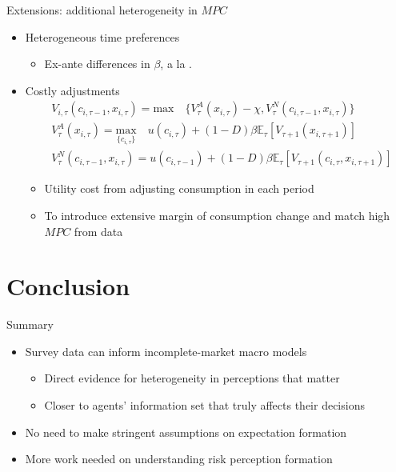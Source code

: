 \documentclass{beamer}
\begin{document}
\begin{frame}{Extensions: additional heterogeneity in $MPC$}

\begin{itemize}
	\item Heterogeneous time preferences
\begin{itemize}
	\item Ex-ante differences in $\beta$, a la \cite{krusell1998income,carroll2017distribution,krueger2016macroeconomics}.
\end{itemize}
	\item Costly adjustments
	\begin{equation*}
		\begin{split}
			& V_{i,\tau}(c_{i,\tau-1},x_{i,\tau}) = \textrm{max} \quad \{V^A_{\tau}(x_{i,\tau})-\chi,V^N_{\tau}(c_{i,\tau-1},x_{i,\tau})\} \\
			& V^A_{\tau}(x_{i,\tau}) = \underset{\{c_{i,\tau}\}}{\textrm{max}} \quad u(c_{i,\tau}) + (1-D)\beta \mathbb{E}_{\tau}\left[V_{\tau+1}(x_{i,\tau+1})\right]  \\
			& V^N_{\tau}(c_{i,\tau-1},x_{i,\tau}) =  u(c_{i,\tau-1}) + (1-D)\beta \mathbb{E}_{\tau}\left[V_{\tau+1}(c_{i,\tau},x_{i,\tau+1})\right]
		\end{split}
	\end{equation*}
	\begin{itemize}
		\item Utility cost from adjusting consumption in each period
		\item To introduce extensive margin of consumption change and match high $MPC$ from data 
	\end{itemize}
\end{itemize}
 \end{frame}




\section{Conclusion}


\begin{frame}{Summary}
	
	\begin{itemize}
 	\item Survey data can inform incomplete-market macro models 
 	\begin{itemize}
 		\item Direct evidence for heterogeneity in perceptions that matter
 		\item Closer to agents' information set that truly affects their decisions
 	\end{itemize}
	\item No need to make stringent assumptions on expectation formation
	\item More work needed on understanding risk perception formation  
	\end{itemize}
\end{frame}
\end{document}
